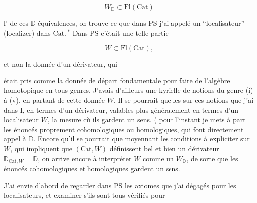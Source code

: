 \[ W_{\mathbb D}\subset\mathrm{Fl}(\mathrm{Cat}) \]

l' de ces $\mathbb D$-équivalences, on trouve ce que dans PS j'ai appelé un ``localisateur'' (localizer) dans $\mathrm{Cat}$.$\,{}^{*}$ Dans PS c'était une telle partie

\[ W\subset\mathrm{Fl}(\mathrm{Cat}), \]

et non  la donnée d'un dérivateur, qui


était pris comme la donnée de départ fondamentale pour faire de l'algèbre homotopique en tous genres. J'avais d'ailleurs  une kyrielle de notions du  genre (i) à (v), en partant de cette donnée $W$. Il se pourrait que  les    sur ces notions que j'ai  dans $\mathrm I$, en termes d'un dérivateur,  valables plus généralement en termes d'un localisateur $W$,   la mesure  où ils gardent un sens. ( pour l'instant je mets à part les énoncés proprement cohomologiques ou homologiques, qui font directement appel à $\mathbb D$. Encore qu'il se pourrait que moyennant les conditions à expliciter sur $W$, qui impliquent que $(\mathrm{Cat},W)$ définissent bel et bien un dérivateur $\mathbb D_{\mathrm{Cat},W}=\mathbb D$, on arrive encore à interpréter $W$ comme un $W_{\mathbb D}$, de sorte que les énoncés cohomologiques et homologiques gardent un sens.

J'ai envie d'abord de regarder dans PS les axiomes que j'ai dégagés pour les localisateurs, et examiner s'ils sont tous vérifiés pour
